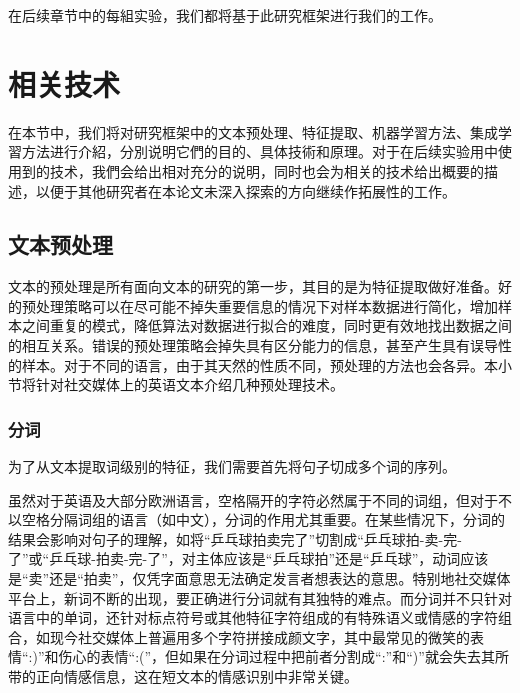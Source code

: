 在后续章节中的每組实验，我们都将基于此研究框架进行我们的工作。

\section{相关技术}
\label{sec:technology}

在本节中，我们将对研究框架中的文本预处理、特征提取、机器学習方法、集成学習方法进行介紹，分別说明它們的目的、具体技術和原理。对于在后续实验用中使用到的技术，我們会给出相对充分的说明，同时也会为相关的技术给出概要的描述，以便于其他研究者在本论文未深入探索的方向继续作拓展性的工作。

\subsection{文本预处理}
\label{ssec:text_preprocess}

文本的预处理是所有面向文本的研究的第一步，其目的是为特征提取做好准备。好的预处理策略可以在尽可能不掉失重要信息的情况下对样本数据进行简化，增加样本之间重复的模式，降低算法对数据进行拟合的难度，同时更有效地找出数据之间的相互关系。错误的预处理策略会掉失具有区分能力的信息，甚至产生具有误导性的样本。对于不同的语言，由于其天然的性质不同，预处理的方法也会各异。本小节将针对社交媒体上的英语文本介绍几种预处理技术。

\subsubsection{分词}
\label{sssec:tokenization}

为了从文本提取词级别的特征，我们需要首先将句子切成多个词的序列。

虽然对于英语及大部分欧洲语言，空格隔开的字符必然属于不同的词组，但对于不以空格分隔词组的语言（如中文），分词的作用尤其重要。在某些情况下，分词的结果会影响对句子的理解，如将“乒乓球拍卖完了”切割成“乒乓球拍-卖-完-了”或“乒乓球-拍卖-完-了”，对主体应该是“乒乓球拍”还是“乒乓球”，动词应该是“卖”还是“拍卖”，仅凭字面意思无法确定发言者想表达的意思。特别地社交媒体平台上，新词不断的出现，要正确进行分词就有其独特的难点。而分词并不只针对语言中的单词，还针对标点符号或其他特征字符组成的有特殊语义或情感的字符组合，如现今社交媒体上普遍用多个字符拼接成颜文字，其中最常见的微笑的表情“:)”和伤心的表情“:(”，但如果在分词过程中把前者分割成“:”和“)”就会失去其所带的正向情感信息，这在短文本的情感识别中非常关键。

